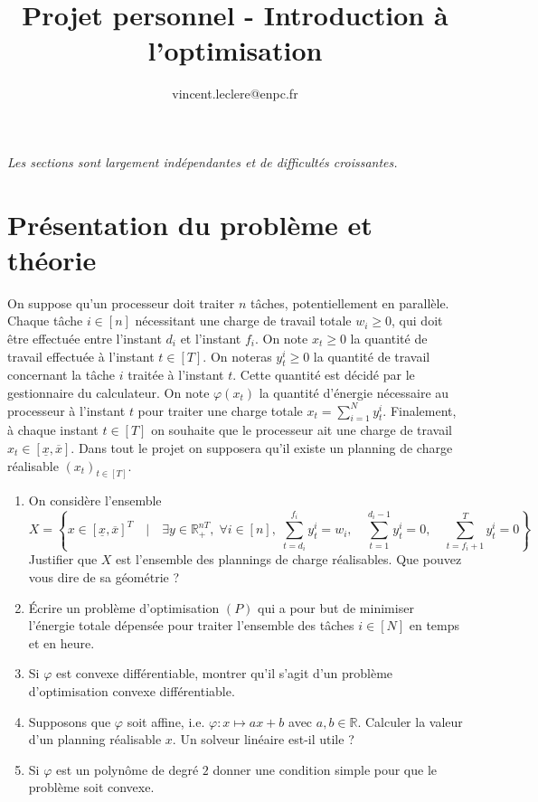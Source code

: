 \documentclass[10pt]{article}
\title{Projet personnel - Introduction à l'optimisation}
\author{vincent.leclere@enpc.fr}
\def\R{\mathbb{R}}
\begin{document}
\maketitle

{\em Les sections sont largement indépendantes et de difficultés croissantes. }

\section{Présentation du problème et théorie}

On suppose qu'un processeur doit traiter $n$ tâches, potentiellement en parallèle. Chaque tâche $i\in[n]$
nécessitant une charge de travail totale $w_i \geq 0$, qui doit être effectuée entre l'instant
$d_i$ et l'instant $f_i$. On note $x_t \geq 0$ la quantité de travail effectuée à l'instant
$t \in [T]$.
On noteras $y_t^i \geq 0$ la quantité de travail concernant
la tâche $i$ traitée à l'instant $t$. Cette quantité est décidé par le gestionnaire du calculateur.
On note $\varphi(x_t)$ la quantité d'énergie nécessaire au processeur à l'instant
$t$ pour traiter une charge totale $x_t = \sum_{i=1}^N y_t^i$.
Finalement, à chaque instant $t\in[T]$ on souhaite
que le processeur ait une charge de travail $x_t \in [\underline{x},\overline{x}]$.
Dans tout le projet on supposera qu'il existe un planning de charge réalisable $(x_t)_{t\in[T]}$.

\begin{enumerate}
 \item On considère l'ensemble
 $$X = \left\{x \in [\underline{x},\overline{x}]^T \quad \bigg| \quad \exists y \in \R_+^{nT}, \; \forall i\in[n],\; \sum_{t=d_i}^{f_i}y_t^i = w_i, \quad \sum_{t=1}^{d_i-1} y_t^i=0, \quad \sum_{t=f_i +1}^{T} y_t^i=0
 \right\}$$
 Justifier que $X$ est l'ensemble des plannings de charge réalisables. Que pouvez vous dire de sa géométrie ?
 \item \'Ecrire un problème d'optimisation $(P)$ qui a pour but de minimiser l'énergie totale dépensée pour traiter l'ensemble des tâches $i\in[N]$ en temps et en heure.
 \item Si $\varphi$ est convexe différentiable, montrer qu'il s'agit d'un problème d'optimisation convexe différentiable.
 \item Supposons que $\varphi$ soit affine, i.e. $\varphi : x  \mapsto ax + b $ avec $a,b\in\R$.
 Calculer la valeur d'un planning réalisable $x$. Un solveur linéaire est-il utile ?
 \item Si $\varphi$ est un polynôme de degré $2$ donner une condition simple pour que le problème soit convexe.
\end{enumerate}
\end{document}
